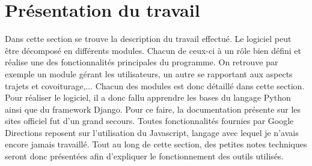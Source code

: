\documentclass[12pt, a4paper, oneside]{article}
\begin{document}
\section{Présentation du travail}\label{taff}
    Dans cette section se trouve la description du travail effectué. Le logiciel peut être décomposé en différents modules. Chacun de ceux-ci à un rôle bien défini et réalise une des fonctionnalités principales du programme.  On retrouve par exemple un module gérant les utilisateurs, un autre se rapportant aux aspects trajets et covoiturage,... Chacun des modules est donc détaillé dans cette section.\\
    \indent Pour réaliser le logiciel, il a donc fallu apprendre les bases du langage Python ainsi que du framework Django. Pour ce faire, la documentation présente sur les sites officiel fut d'un grand secours. Toutes fonctionnalités fournies par Google Directions reposent sur l'utilisation du Javascript, langage avec lequel je n'avais encore jamais travaillé. Tout au long de cette section, des petites notes techniques seront donc présentées afin d'expliquer le fonctionnement des outils utilisés.\\
\end{document}
